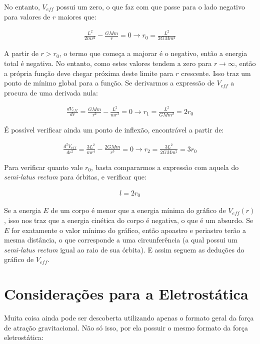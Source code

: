 No entanto, $V_{eff}$ possui um zero, o que faz com que passe para o lado negativo para valores de $r$ maiores que:

\begin{eqnarray}
	\frac{L^2}{2mr^2} - \frac{GMm}{r} = 0 \rightarrow r_0 = \frac{L^2}{2GMm^2}	\label{eq58}
\end{eqnarray} 

A partir de $r > r_0$, o termo que começa a majorar é o negativo, então a energia total é negativa. No entanto, como estes valores tendem a zero para $r \rightarrow \infty$, então a própria função deve chegar próxima deste limite para $r$ crescente. Isso traz um ponto de mínimo global para a função. Se derivarmos a expressão de $V_{eff}$ a procura de uma derivada nula:

\begin{eqnarray}
	\frac{dV_{eff}}{dr} = \frac{GMm}{r^2} -\frac{L^2}{mr^3} = 0 \rightarrow r_1 = \frac{L^2}{GMm^2} = 2r_0	\label{eq59}
\end{eqnarray} 

É possível verificar ainda um ponto de inflexão, encontrável a partir de:

\begin{eqnarray}
	\frac{d^2V_{eff}}{dr^2} = \frac{3L^2}{mr^4} - \frac{2GMm}{r^3}  = 0 \rightarrow r_2 = \frac{3L^2}{2GMm^2} = 3r_0	\label{eq60}
\end{eqnarray}

Para verificar quanto vale $r_0$, basta compararmos a expressão com aquela do \textit{semi-latus rectum} para órbitas, e verificar que:

\begin{eqnarray}
	l = 2r_0	\label{eq61}
\end{eqnarray}

Se a energia $E$ de um corpo é menor que a energia mínima do gráfico de $V_{eff}(r)$, isso nos traz que a energia cinética do corpo é negativa, o que é um absurdo. Se $E$ for exatamente o valor mínimo do gráfico, então apoastro e periastro terão a mesma distância, o que corresponde a uma circunferência (a qual possui um \textit{semi-latus rectum} igual ao raio de sua órbita). E assim seguem as deduções do gráfico de $V_{eff}$.

\section{Considerações para a Eletrostática}

Muita coisa ainda pode ser descoberta utilizando apenas o formato geral da força de atração gravitacional. Não só isso, por ela possuir o mesmo formato da força eletrostática:


